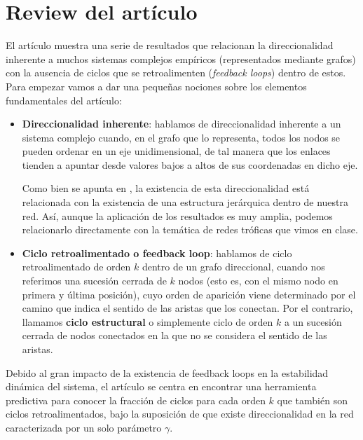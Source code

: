 \documentclass[1p]{elsarticle}
\begin{document}
\section{Review del artículo}
El artículo muestra una serie de resultados que relacionan la direccionalidad inherente a muchos sistemas complejos empíricos (representados mediante grafos) con la ausencia de ciclos que se retroalimenten (\textit{feedback loops}) dentro de estos. 
Para empezar vamos a dar una pequeñas nociones sobre los elementos fundamentales del artículo:
\begin{itemize}
	\item \textbf{Direccionalidad inherente}: hablamos de direccionalidad inherente a un sistema complejo cuando, en el grafo que lo representa, todos los nodos se pueden ordenar en un eje unidimensional, de tal manera que los enlaces tienden a apuntar desde valores bajos a altos de sus coordenadas en dicho eje. 
	
	Como bien se apunta en \cite{arti}, la existencia de esta direccionalidad está relacionada con la existencia de una estructura jerárquica dentro de nuestra red. Así, aunque la aplicación de los resultados es muy amplia, podemos relacionarlo directamente con la temática de redes tróficas que vimos en clase. 

	\item \textbf{Ciclo retroalimentado o feedback loop}: hablamos de ciclo retroalimentado de orden $k$ dentro de un grafo direccional, cuando nos referimos una sucesión cerrada de $k$ nodos (esto es, con el mismo nodo en primera y última posición), cuyo orden de aparición viene determinado por el camino que indica el sentido de las aristas que los conectan.
        Por el contrario, llamamos \textbf{ciclo estructural} o simplemente ciclo de orden $k$ a un sucesión cerrada de nodos conectados en la que no se considera el sentido de las aristas.
\end{itemize}


    Debido al gran impacto de la existencia de feedback loops en la estabilidad dinámica del sistema, el artículo se centra en encontrar una herramienta predictiva para conocer  la fracción de ciclos para cada orden $k$ que también son ciclos retroalimentados, bajo la suposición de que existe direccionalidad en la red caracterizada por un solo parámetro $\gamma$. 
\end{document}
